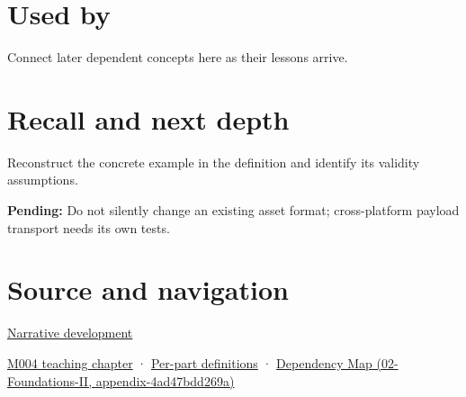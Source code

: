 \section{Used by}\label{appendix-e90053a4b201-used-by}

Connect later dependent concepts here as their lessons arrive.

\section{Recall and next depth}\label{appendix-e90053a4b201-recall-and-next-depth}

Reconstruct the concrete example in the definition and identify its validity assumptions.

\textbf{Pending:} Do not silently change an existing asset format; cross-platform payload transport needs its own tests.

\section{Source and navigation}\label{appendix-e90053a4b201-source-and-navigation}

\href{Continuous\%20Notes/Computing\%20Foundations\%20-\%20From\%20Bits\%20to\%20C++\%20and\%20Systems\%20APIs\#Choosing\%20what\%20information\%20to\%20keep}{Narrative development}

\href{Continuous\%20Notes/Computing\%20Foundations\%20-\%20From\%20Bits\%20to\%20C++\%20and\%20Systems\%20APIs\#A\%20stretching\%20ruler\%20for\%20real-valued\%20quantities}{M004 teaching chapter} · \hyperref[appendix-fd090d982a15-m004---parts-61-76]{Per-part definitions} · \href{../02-Foundations-II/main.pdf\#nameddest=appendix-4ad47bdd269a}{Dependency Map (02-Foundations-II, appendix-4ad47bdd269a)}
